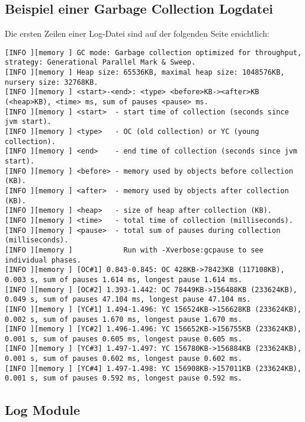 \subsection{Beispiel einer Garbage Collection Logdatei}
Die ersten Zeilen einer Log-Datei sind auf der folgenden Seite ersichtlich:
\begin{landscape}\label{logexample}
\begin{lstlisting}[caption=Garbage Collection Logdatei]
[INFO ][memory ] GC mode: Garbage collection optimized for throughput, strategy: Generational Parallel Mark & Sweep.
[INFO ][memory ] Heap size: 65536KB, maximal heap size: 1048576KB, nursery size: 32768KB.
[INFO ][memory ] <start>-<end>: <type> <before>KB-><after>KB (<heap>KB), <time> ms, sum of pauses <pause> ms.
[INFO ][memory ] <start>  - start time of collection (seconds since jvm start).
[INFO ][memory ] <type>   - OC (old collection) or YC (young collection).
[INFO ][memory ] <end>    - end time of collection (seconds since jvm start).
[INFO ][memory ] <before> - memory used by objects before collection (KB).
[INFO ][memory ] <after>  - memory used by objects after collection (KB).
[INFO ][memory ] <heap>   - size of heap after collection (KB).
[INFO ][memory ] <time>   - total time of collection (milliseconds).
[INFO ][memory ] <pause>  - total sum of pauses during collection (milliseconds).
[INFO ][memory ]            Run with -Xverbose:gcpause to see individual phases.
[INFO ][memory ] [OC#1] 0.843-0.845: OC 428KB->78423KB (117108KB), 0.003 s, sum of pauses 1.614 ms, longest pause 1.614 ms.
[INFO ][memory ] [OC#2] 1.393-1.442: OC 78449KB->156488KB (233624KB), 0.049 s, sum of pauses 47.104 ms, longest pause 47.104 ms.
[INFO ][memory ] [YC#1] 1.494-1.496: YC 156524KB->156628KB (233624KB), 0.002 s, sum of pauses 1.670 ms, longest pause 1.670 ms.
[INFO ][memory ] [YC#2] 1.496-1.496: YC 156652KB->156755KB (233624KB), 0.001 s, sum of pauses 0.605 ms, longest pause 0.605 ms.
[INFO ][memory ] [YC#3] 1.497-1.497: YC 156780KB->156884KB (233624KB), 0.001 s, sum of pauses 0.602 ms, longest pause 0.602 ms.
[INFO ][memory ] [YC#4] 1.497-1.498: YC 156908KB->157011KB (233624KB), 0.001 s, sum of pauses 0.592 ms, longest pause 0.592 ms.
\end{lstlisting}
\end{landscape}

\subsection{Log Module}\label{logmodule}

